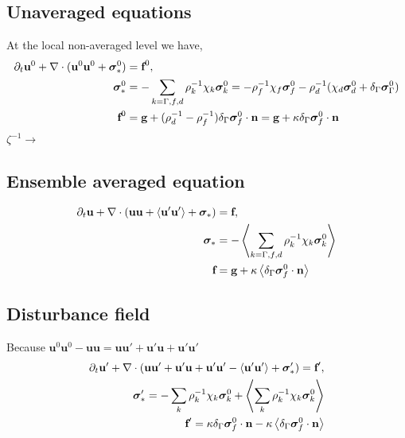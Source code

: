 \subsection{Unaveraged equations }
At the local non-averaged level we have,
\begin{align}
    \partial_t \textbf{u}^0 + \mathbf{\nabla}\cdot ( \textbf{u}^0\textbf{u}^0 + \bm\sigma^0_*)
    &= \textbf{f}^0,
    \;\;\\
    \bm\sigma^0_*
    &=
    -\sum_{k=\Gamma,f,d} \rho^{-1}_k \chi_k \bm\sigma_k^0
    =
      -  \rho_f^{-1} \chi_f \bm\sigma_f^0
    - \rho_d^{-1} (\chi_d \bm\sigma_d^0 + \delta_{\Gamma} \bm\sigma_{\Gamma}^0)\\
    \textbf{f}^0 &= 
    \textbf{g}
    +(\rho_d^{-1}-\rho_f^{-1}) \delta_{\Gamma}  \bm\sigma_f^0 \cdot \textbf{n}
    = 
    \textbf{g}
    +\kappa {\delta_{\Gamma}  \bm\sigma_f^0 \cdot \textbf{n}}
\end{align}
$\zeta^{-1} \to $
\subsection{Ensemble averaged equation}
\begin{align}
    \partial_t \textbf{u} + \mathbf{\nabla}\cdot ( \textbf{u}\textbf{u} + \left<\textbf{u}'\textbf{u}'\right>+ \bm\sigma_*)
    &= \textbf{f},\\
    \bm\sigma_*
    &=
    -\left<\sum_{k=\Gamma,f,d} \rho^{-1}_k \chi_k \bm\sigma_k^0\right>\\
    \textbf{f} &= 
    \textbf{g}
    +\kappa \left<\delta_{\Gamma}  \bm\sigma_f^0 \cdot \textbf{n}\right>
\end{align}
\subsection{Disturbance field}
Because $\textbf{u}^0 \textbf{u}^0 - \textbf{uu} = \textbf{uu}' + \textbf{u}' \textbf{u} + \textbf{u}' \textbf{u}'$
\begin{align}
    \partial_t \textbf{u}'
    + \mathbf{\nabla}\cdot (
         \textbf{u}\textbf{u}'
        +  \textbf{u}' \textbf{u}
        +  \textbf{u}' \textbf{u}'
        -\left<\textbf{u}'\textbf{u}'\right>
        + \bm\sigma_*')
    = \textbf{f}',\\
    \bm\sigma_*'
    =
    -\sum_k \rho^{-1}_k \chi_k \bm\sigma_k^0
    + \left<\sum_k \rho^{-1}_k \chi_k \bm\sigma_k^0  \right>\\
    \textbf{f}'
    =
    \kappa \delta_{\Gamma}  \bm\sigma_f^0 \cdot \textbf{n}
    - \kappa \left<\delta_{\Gamma}  \bm\sigma_f^0 \cdot \textbf{n}\right>
    \\
\end{align}
